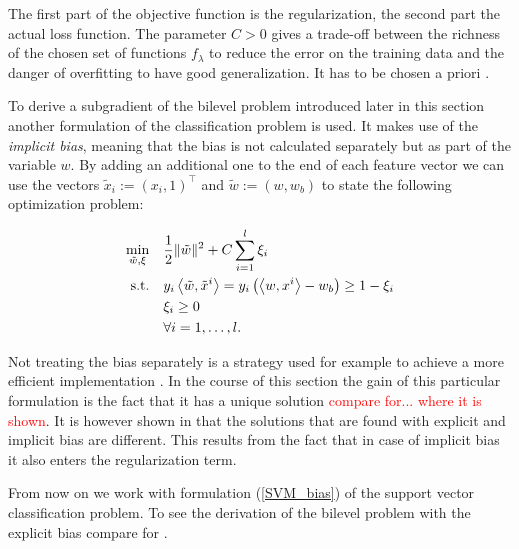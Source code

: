 The first part of the objective function is the regularization, the second part the actual loss function. 
The parameter \(C > 0\) gives a trade-off between the richness of the chosen set of functions \(f_{\lambda}\) to reduce the error on the training data and the danger of overfitting to have good generalization. It has to be chosen a priori \cite{Kunapuli2008}.

To derive a subgradient of the bilevel problem introduced later in this section another formulation of the classification problem is used.
It makes use of the \emph{implicit bias}, meaning that the bias is not calculated separately but as part of the variable \(w\). 
By adding an additional one to the end of each feature vector we can use the vectors \(\tilde{x}_i := (x_i,1)^{\top}\) and \(\tilde{w} := (w,w_b)\) to state the following optimization problem:

\begin{align}
\begin{split}
	\min_{\tilde{w},\xi} \quad & \frac{1}{2} \|\tilde{w}\|^2+C\sum_{i=1}^l{\xi_i} \vspace{0.5ex}\\
	\text{s.t.} \quad & y_i\Langle \tilde{w},\tilde{x}^i\Rangle = y_i\left(\Langle w,x^i\Rangle-w_b\right) \geq 1 - \xi_i \vspace{0.5ex}\\
	& \xi_i \geq 0 \\
	& 	\forall i = 1, \dots , l.
\end{split}
\label{SVM_bias}
\end{align}

Not treating the bias separately is a strategy used for example to achieve a more efficient implementation \cite[section 3.2, p. 22]{Gunn1998}. In the course of this section the gain of this particular formulation is the fact that it has a unique solution \textcolor{red}{compare for... where it is shown}.
It is however shown in \cite[section 3.2, p. 22]{Gunn1998} that the solutions that are found with explicit and implicit bias are different.
This results from the fact that in case of implicit bias it also enters the regularization term.

From now on we work with formulation (\ref{SVM_bias}) of the support vector classification problem. To see the derivation of the bilevel problem with the explicit bias compare for \cite{Kunapuli2008}.

